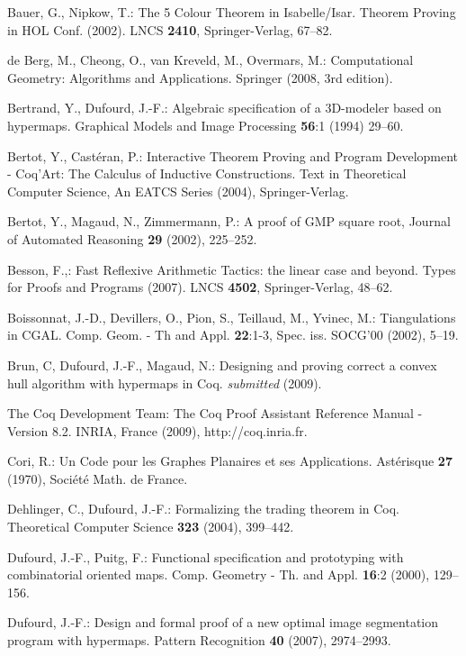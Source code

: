 \documentclass{llncs}
\begin{document}
\begin{thebibliography}{99}
Bauer, G., Nipkow, T.:
The 5 Colour Theorem in Isabelle/Isar.
Theorem Proving in HOL Conf. (2002).
LNCS {\bfseries 2410}, Springer-Verlag, 67--82.

de Berg, M., Cheong, O., van Kreveld, M., Overmars, M.:
Computational Geometry: Algorithms and Applications.
Springer (2008, 3rd edition).

Bertrand, Y., Dufourd, J.-F.:
Algebraic specification of a 3D-modeler based on hypermaps.
Graphical Models and Image Processing {\bfseries 56}:1 (1994) 29--60.

Bertot, Y., Cast\'eran, P.:
Interactive Theorem Proving and Program Development -
Coq'Art: The Calculus of Inductive Constructions.
Text in Theoretical Computer Science, An EATCS Series (2004), Springer-Verlag.

Bertot, Y., Magaud, N., Zimmermann, P.:
A proof of GMP square root,
Journal of Automated Reasoning {\bfseries 29} (2002), {225--252}.

Besson, F.,:
Fast Reflexive Arithmetic Tactics: the linear case and beyond.
Types for Proofs and Programs (2007).
LNCS {\bfseries 4502}, Springer-Verlag, 48--62.

Boissonnat, J.-D., Devillers, O., Pion, S., Teillaud, M., Yvinec, M.:
Tiangulations in CGAL.
Comp. Geom. - Th and Appl. {\bfseries 22}:1-3, Spec. iss. SOCG'00 (2002), 5--19.

Brun, C, Dufourd, J.-F., Magaud, N.:
Designing and proving correct a convex hull algorithm with hypermaps in Coq.
{\em submitted} (2009).


The Coq Development Team:
The Coq Proof Assistant Reference Manual - Version 8.2. 
INRIA, France (2009), http://coq.inria.fr.

Cori, R.:
Un Code pour les Graphes Planaires et ses Applications.
Ast\'erisque {\bfseries 27} (1970), Soci\'et\'e Math. de France.

Dehlinger, C., Dufourd, J.-F.:
Formalizing the trading theorem in Coq.
Theoretical Computer Science  {\bfseries 323} (2004), 399--442.

Dufourd, J.-F., Puitg, F.:
Functional specification and prototyping with combinatorial oriented maps.
Comp. Geometry - Th. and Appl. {\bfseries 16}:2 (2000), 129--156.

Dufourd, J.-F.:
Design and formal proof of a new optimal image segmentation program with hypermaps.
Pattern Recognition {\bfseries 40} (2007), 2974--2993.


\end{thebibliography}
\end{document}
